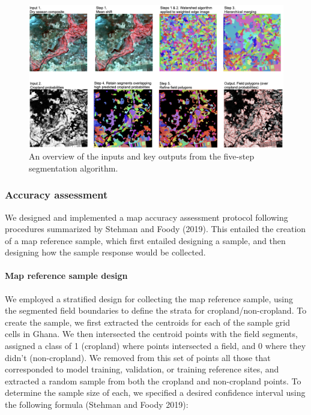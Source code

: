 \documentclass[
  11pt,
  a4paper]{article}
\begin{document}
\begin{figure}[!ht]

{\centering \includegraphics[width=1\linewidth,]{figures/si_segmentation_workflow} 

}

\caption{An overview of the inputs and key outputs from the five-step segmentation algorithm.}\label{fig:segfig}
\end{figure}

\hypertarget{accuracy-assessment}{%
\subsubsection{Accuracy assessment}\label{accuracy-assessment}}

We designed and implemented a map accuracy assessment protocol following
procedures summarized by Stehman and Foody (2019). This entailed the
creation of a map reference sample, which first entailed designing a
sample, and then designing how the sample response would be collected.

\hypertarget{map-reference-sample-design}{%
\paragraph{Map reference sample
design}\label{map-reference-sample-design}}

We employed a stratified design for collecting the map reference sample,
using the segmented field boundaries to define the strata for
cropland/non-cropland. To create the sample, we first extracted the
centroids for each of the sample grid cells in Ghana. We then
intersected the centroid points with the field segments, assigned a
class of 1 (cropland) where points intersected a field, and 0 where they
didn't (non-cropland). We removed from this set of points all those that
corresponded to model training, validation, or training reference sites,
and extracted a random sample from both the cropland and non-cropland
points. To determine the sample size of each, we specified a desired
confidence interval using the following formula (Stehman and Foody
2019):
\end{document}
